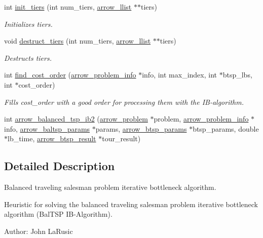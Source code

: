 \begin{CompactItemize}
int \hyperlink{lib_2baltsp_2baltsp-ib2_8c_05a2ff158dd6edc613a6623787c04a31}{init\_\-tiers} (int num\_\-tiers, \hyperlink{structarrow__llist}{arrow\_\-llist} $\ast$$\ast$tiers)
\begin{CompactList}\small\item\em Initializes tiers. \item\end{CompactList}\item 
void \hyperlink{lib_2baltsp_2baltsp-ib2_8c_086f8eb237774105f487040ef6ac62df}{destruct\_\-tiers} (int num\_\-tiers, \hyperlink{structarrow__llist}{arrow\_\-llist} $\ast$$\ast$tiers)
\begin{CompactList}\small\item\em Destructs tiers. \item\end{CompactList}\item 
int \hyperlink{lib_2baltsp_2baltsp-ib2_8c_fe2b4359a26c49fe7602c86021b91ee7}{find\_\-cost\_\-order} (\hyperlink{structarrow__problem__info}{arrow\_\-problem\_\-info} $\ast$info, int max\_\-index, int $\ast$btsp\_\-lbs, int $\ast$cost\_\-order)
\begin{CompactList}\small\item\em Fills cost\_\-order with a good order for processing them with the IB-algorithm. \item\end{CompactList}\item 
int \hyperlink{lib_2baltsp_2baltsp-ib2_8c_f99b10e444262402df58c126c5818b75}{arrow\_\-balanced\_\-tsp\_\-ib2} (\hyperlink{structarrow__problem}{arrow\_\-problem} $\ast$problem, \hyperlink{structarrow__problem__info}{arrow\_\-problem\_\-info} $\ast$info, \hyperlink{structarrow__baltsp__params}{arrow\_\-baltsp\_\-params} $\ast$params, \hyperlink{structarrow__btsp__params}{arrow\_\-btsp\_\-params} $\ast$btsp\_\-params, double $\ast$lb\_\-time, \hyperlink{structarrow__btsp__result}{arrow\_\-btsp\_\-result} $\ast$tour\_\-result)
\end{CompactItemize}


\subsection{Detailed Description}
Balanced traveling salesman problem iterative bottleneck algorithm. 

Heuristic for solving the balanced traveling salesman problem iterative bottleneck algorithm (BalTSP IB-Algorithm).

\begin{Desc}
\item[Author:]John LaRusic \end{Desc}


